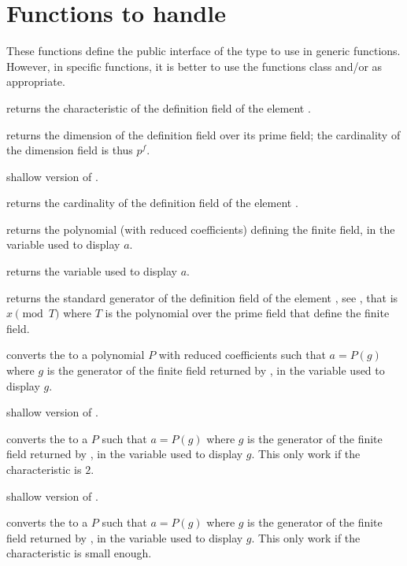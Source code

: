 \section{Functions to handle }
These functions define the public interface of the  type to use in
generic functions.  However, in specific functions, it is better to use the
functions class  and/or  as appropriate.

 returns the characteristic of the definition field of the
 element .

 returns the dimension of the definition field over
its prime field; the cardinality of the dimension field is thus $p^f$.

 shallow version of .

 returns the cardinality of the definition field of the
 element .

 returns the polynomial (with reduced 
coefficients) defining the finite field, in the variable used to display $a$.

 returns the variable used to display $a$.

 returns the standard generator of the definition field
of the  element , see , that is $x\pmod{T}$ where
$T$ is the polynomial over the prime field that define the finite field.

 converts the   to a polynomial
$P$ with reduced  coefficients such that $a=P(g)$ where $g$ is the
generator of the finite field returned by , in the variable used to
display $g$.

 shallow version of .

 converts the   to a 
$P$ such that $a=P(g)$ where $g$ is the generator of the finite field returned
by , in the variable used to display $g$. This only work if the
characteristic is $2$.

 shallow version of .

 converts the   to a 
$P$ such that $a=P(g)$ where $g$ is the generator of the finite field returned
by , in the variable used to display $g$. This only work if the
characteristic is small enough.

